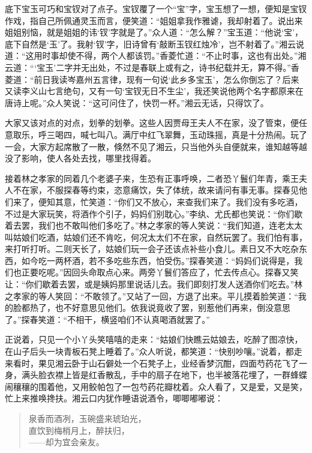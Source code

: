 \documentclass[12pt,oneside]{book}
\newenvironment{shici}{%
\begin{verse}%
\centering\large\hspace{12pt}}%
{\end{verse}}
\begin{document}
底下宝玉可巧和宝钗对了点子。宝钗覆了一个“宝”字，宝玉想了一想，便知是宝钗作戏，指自己所佩通灵玉而言，便笑道：“姐姐拿我作雅谑，我却射着了。说出来姐姐别恼，就是姐姐的讳‘钗’字就是了。”众人道：“怎么解？”宝玉道：“他说‘宝’，底下自然是‘玉’了。我射‘钗’字，旧诗曾有‘敲断玉钗红烛冷’，岂不射着了。”湘云说道：“这用时事却使不得，两个人都该罚。”香菱忙道：“不止时事，这也有出处。”湘云道：“‘宝玉’二字并无出处，不过是春联上或有之，诗书纪载并无，算不得。”香菱道：“前日我读岑嘉州五言律，现有一句说‘此乡多宝玉’，怎么你倒忘了？后来又读李义山七言绝句，又有一句‘宝钗无日不生尘’，我还笑说他两个名字都原来在唐诗上呢。”众人笑说：“这可问住了，快罚一杯。”湘云无话，只得饮了。

大家又该对点的对点，划拳的划拳。这些人因贾母王夫人不在家，没了管束，便任意取乐，呼三喝四，喊七叫八。满厅中红飞翠舞，玉动珠摇，真是十分热闹。玩了一会，大家方起席散了一散，倏然不见了湘云，只当他外头自便就来，谁知越等越没了影响，使人各处去找，哪里找得着。

接着林之孝家的同着几个老婆子来，生恐有正事呼唤，二者恐丫鬟们年青，乘王夫人不在家，不服探春等约束，恣意痛饮，失了体统，故来请问有事无事。探春见他们来了，便知其意，忙笑道：“你们又不放心，来查我们来了。我们没有多吃酒，不过是大家玩笑，将酒作个引子，妈妈们别耽心。”李纨、尤氏都也笑说：“你们歇着去罢，我们也不敢叫他们多吃了。”林之孝家的等人笑说：“我们知道，连老太太叫姑娘们吃酒，姑娘们还不肯吃，何况太太们不在家，自然玩罢了。我们怕有事，来打听打听。二则天长了，姑娘们玩一会子还该点补些小食儿。素日又不大吃杂东西，如今吃一两杯酒，若不多吃些东西，怕受伤。”探春笑道：“妈妈们说得是，我们也正要吃呢。”因回头命取点心来。两旁丫鬟们答应了，忙去传点心。探春又笑让：“你们歇着去罢，或是姨妈那里说话儿去。我们即刻打发人送酒你们吃去。”林之孝家的等人笑回：“不敢领了。”又站了一回，方退了出来。平儿摸着脸笑道：“我的脸都热了，也不好意思见他们。依我说竟收了罢，别惹他们再来，倒没意思了。”探春笑道：“不相干，横竖咱们不认真喝酒就罢了。”

正说着，只见一个小丫头笑嘻嘻的走来：“姑娘们快瞧云姑娘去，吃醉了图凉快，在山子后头一块青板石凳上睡着了。”众人听说，都笑道：“快别吵嚷。”说着，都走来看时，果见湘云卧于山石僻处一个石凳子上，业经香梦沉酣，四面芍药花飞了一身，满头脸衣襟上皆是红香散乱，手中的扇子在地下，也半被落花埋了，一群蜂蝶闹穰穰的围着他，又用鲛帕包了一包芍药花瓣枕着。众人看了，又是爱，又是笑，忙上来推唤搀扶。湘云口内犹作睡语说酒令，唧唧嘟嘟说：

\begin{shici}
泉香而酒冽，玉碗盛来琥珀光，\\
直饮到梅梢月上，醉扶归，\\
——却为宜会亲友。
\end{shici}
\end{document}
